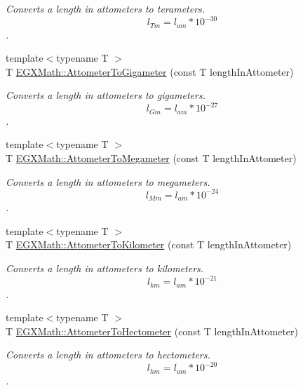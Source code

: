 \begin{DoxyCompactItemize}
\begin{DoxyCompactList}\small\item\em Converts a length in attometers to terameters. \[ l_{Tm}=l_{am} * 10^{-30} \]. \end{DoxyCompactList}\item 
{\footnotesize template$<$typename T $>$ }\\T \mbox{\hyperlink{group___e_g_x_math-_conversions-_length_conversions-_s_i-_attometer-_s_i_ga6d8498c20f3df80b922e6cb076c35fb8}{E\+G\+X\+Math\+::\+Attometer\+To\+Gigameter}} (const T length\+In\+Attometer)
\begin{DoxyCompactList}\small\item\em Converts a length in attometers to gigameters. \[ l_{Gm}=l_{am} * 10^{-27} \]. \end{DoxyCompactList}\item 
{\footnotesize template$<$typename T $>$ }\\T \mbox{\hyperlink{group___e_g_x_math-_conversions-_length_conversions-_s_i-_attometer-_s_i_gad381bcfa61a8521acea1c79f84750a5d}{E\+G\+X\+Math\+::\+Attometer\+To\+Megameter}} (const T length\+In\+Attometer)
\begin{DoxyCompactList}\small\item\em Converts a length in attometers to megameters. \[ l_{Mm}=l_{am} * 10^{-24} \]. \end{DoxyCompactList}\item 
{\footnotesize template$<$typename T $>$ }\\T \mbox{\hyperlink{group___e_g_x_math-_conversions-_length_conversions-_s_i-_attometer-_s_i_gafc247d0f5b16a1e83c2f210812ee41e8}{E\+G\+X\+Math\+::\+Attometer\+To\+Kilometer}} (const T length\+In\+Attometer)
\begin{DoxyCompactList}\small\item\em Converts a length in attometers to kilometers. \[ l_{km}=l_{am} * 10^{-21} \]. \end{DoxyCompactList}\item 
{\footnotesize template$<$typename T $>$ }\\T \mbox{\hyperlink{group___e_g_x_math-_conversions-_length_conversions-_s_i-_attometer-_s_i_gab810b8625e44d4bb227bdff1b0ab2056}{E\+G\+X\+Math\+::\+Attometer\+To\+Hectometer}} (const T length\+In\+Attometer)
\begin{DoxyCompactList}\small\item\em Converts a length in attometers to hectometers. \[ l_{hm}=l_{am} * 10^{-20} \]. \end{DoxyCompactList}\item 

\end{DoxyCompactItemize}
